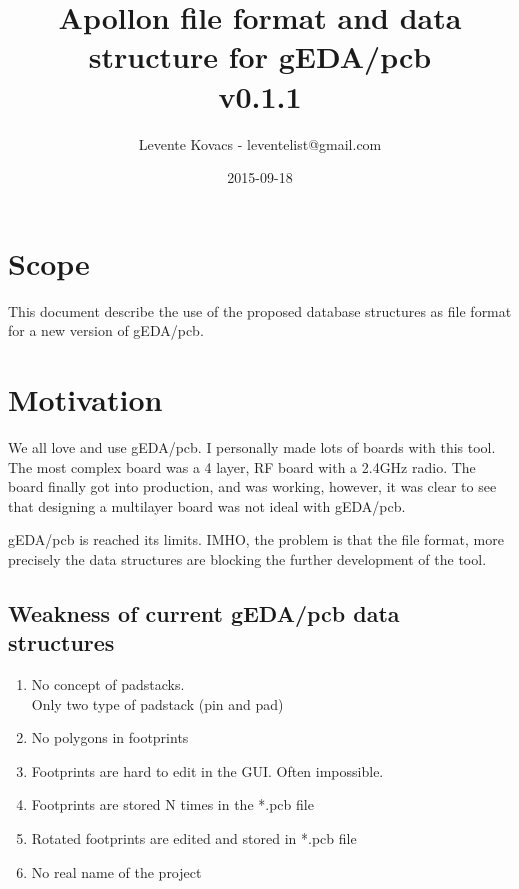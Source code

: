 \documentclass[12pt]{article}
\begin{document}
\title{Apollon file format and data structure for gEDA/pcb\\v0.1.1}
\date{2015-09-18}
\author{Levente Kovacs - leventelist@gmail.com}

\maketitle
\tableofcontents

\section{Scope}\label{scope}

This document describe the use of the proposed database structures as
file format for a new version of gEDA/pcb.

\section{Motivation}\label{motivation}

We all love and use gEDA/pcb. I personally made lots of boards with this tool.
The most complex board was a 4 layer, RF board with a 2.4GHz radio. The
board finally got into production, and was working, however, it was
clear to see that designing a multilayer board was not ideal with gEDA/pcb.

gEDA/pcb is reached its limits. IMHO, the problem is that the file format,
more precisely the data structures are blocking the further development of
the tool.

\subsection{Weakness of current gEDA/pcb data
structures}\label{weakness-of-current-gedapcb-data-structures}

\begin{enumerate}
\item
  No concept of padstacks.\\ Only two type of padstack (pin and pad)
\item
  No polygons in footprints
\item
  Footprints are hard to edit in the GUI. Often impossible.
\item
  Footprints are stored N times in the *.pcb file
\item
  Rotated footprints are edited and stored in *.pcb file
\item
  No real name of the project
\end{enumerate}
\end{document}
